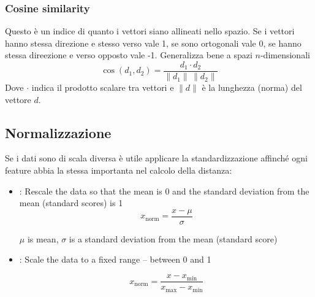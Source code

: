 \subsubsection{Cosine similarity}
Questo è un indice di quanto i vettori siano allineati nello spazio. Se i vettori hanno stessa direzione e stesso verso vale 1, se sono ortogonali vale 0, se hanno stessa direezione e verso opposto vale -1. Generalizza bene a spazi $ n $-dimensionali
\begin{equation*}
	\cos(d_1, d_2) = \frac{d_1 \cdot d_2}{\|d_1\| \, \|d_2\|}
\end{equation*}
Dove $\cdot$ indica il prodotto scalare tra vettori e $\|d\|$ è la lunghezza (norma) del vettore $d$.


\subsection{Normalizzazione}
Se i dati sono di scala diversa è utile applicare la standardizzazione affinché ogni feature abbia la stessa importanta nel calcolo della distanza:
\begin{itemize}
	\item {}: Rescale the data so that the mean is 0 and the standard deviation from the mean (standard scores) is 1
	      \begin{equation*}
		      x_{\text{norm}} = \frac{x - \mu}{\sigma}
	      \end{equation*}
	      \begin{center}
		      $\mu$ is mean, $\sigma$ is a standard deviation from the mean (standard score)
	      \end{center}

	\item {}: Scale the data to a fixed range -- between 0 and 1

	      \begin{equation*}
		      x_{\text{norm}} = \frac{x - x_\text{min}}{x_\text{max} - x_\text{min}}
	      \end{equation*}
\end{itemize}
